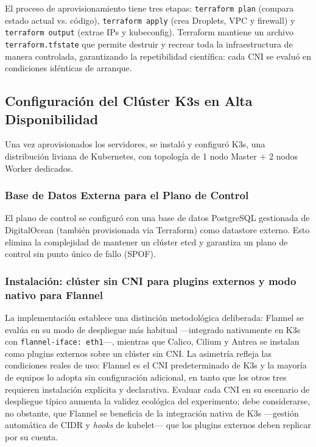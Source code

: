 El proceso de aprovisionamiento tiene tres etapas: \texttt{terraform plan} (compara estado actual vs. código), \texttt{terraform apply} (crea Droplets, VPC y firewall) y \texttt{terraform output} (extrae IPs y kubeconfig). Terraform mantiene un archivo \texttt{terraform.tfstate} que permite destruir y recrear toda la infraestructura de manera controlada, garantizando la repetibilidad científica: cada CNI se evaluó en condiciones idénticas de arranque.

\subsection{Configuración del Clúster K3s en Alta Disponibilidad}

Una vez aprovisionados los servidores, se instaló y configuró K3s, una distribución liviana de Kubernetes, con topología de 1 nodo Master + 2 nodos Worker dedicados.

\subsubsection{Base de Datos Externa para el Plano de Control}

El plano de control se configuró con una base de datos PostgreSQL gestionada de DigitalOcean (también provisionada via Terraform) como datastore externo. Esto elimina la complejidad de mantener un clúster etcd y garantiza un plano de control sin punto único de fallo (SPOF).

\subsubsection{Instalación: clúster sin CNI para plugins externos y modo nativo para Flannel}

La implementación establece una distinción metodológica deliberada: Flannel se evalúa en su modo de despliegue más habitual ---integrado nativamente en K3s con \texttt{flannel-iface: eth1}---, mientras que Calico, Cilium y Antrea se instalan como plugins externos sobre un clúster sin CNI. La asimetría refleja las condiciones reales de uso: Flannel es el CNI predeterminado de K3s y la mayoría de equipos lo adopta sin configuración adicional, en tanto que los otros tres requieren instalación explícita y declarativa. Evaluar cada CNI en su escenario de despliegue típico aumenta la validez ecológica del experimento; debe considerarse, no obstante, que Flannel se beneficia de la integración nativa de K3s ---gestión automática de CIDR y \emph{hooks} de kubelet--- que los plugins externos deben replicar por su cuenta.

